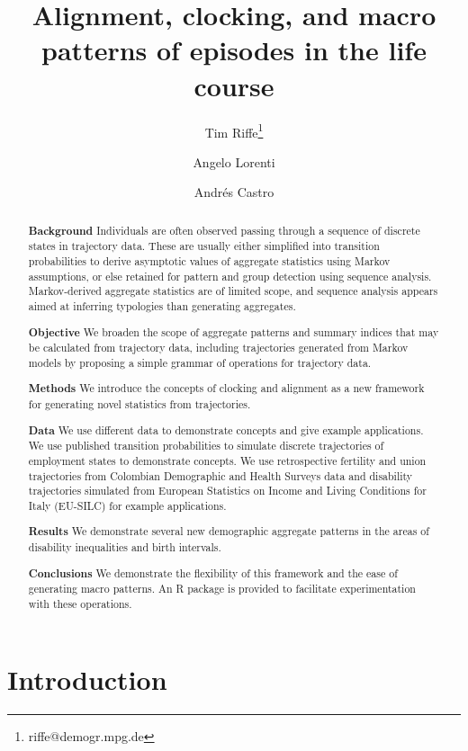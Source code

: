 \documentclass{article}
\newcommand{\absdiv}[1]{%
  \par\addvspace{.5\baselineskip}%
  \noindent\textbf{#1}\quad\ignorespaces
}
\begin{document}
\title{Alignment, clocking, and macro patterns of episodes in the life course}
\author[1]{Tim Riffe\thanks{riffe@demogr.mpg.de}}
\author[1]{Angelo Lorenti}
\author[1]{Andr\'{e}s Castro}
\maketitle

\begin{abstract}

\absdiv{Background}Individuals are often observed passing through a sequence of discrete states in trajectory data. These are usually either simplified into transition probabilities to derive asymptotic values of aggregate statistics using Markov assumptions, or else retained for pattern and group detection using sequence analysis. Markov-derived aggregate statistics are of limited scope, and sequence analysis appears aimed at inferring typologies than generating aggregates.
\absdiv{Objective}We broaden the scope of aggregate patterns and summary indices that may be calculated from trajectory data, including trajectories generated from Markov models by proposing a simple grammar of operations for trajectory data.
\absdiv{Methods}We introduce the concepts of clocking and alignment as a new framework for generating novel statistics from trajectories. 
\absdiv{Data}We use different data to demonstrate concepts and give example applications. We use published transition probabilities to simulate discrete trajectories of employment states to demonstrate concepts. We use retrospective fertility and union trajectories from Colombian Demographic and Health Surveys data and disability trajectories simulated from European Statistics on Income and Living Conditions for Italy (EU-SILC) for example applications.
\absdiv{Results}We demonstrate  several new demographic aggregate patterns in the areas of disability inequalities and birth intervals.
\absdiv{Conclusions}We demonstrate the flexibility of this framework and the ease of generating macro patterns. An R package is provided to facilitate experimentation with these operations.
\end{abstract}

\doublespacing
\section{Introduction}
\end{document}
